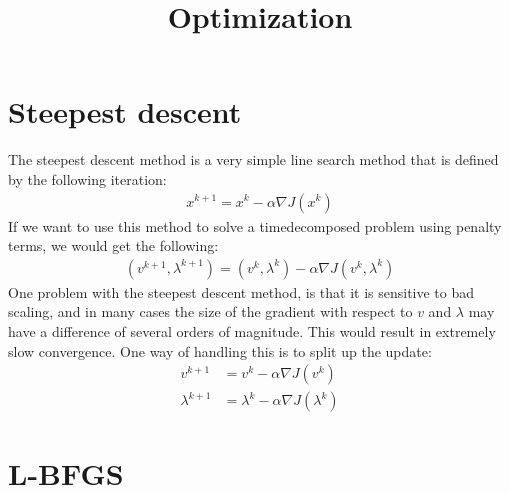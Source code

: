 \documentclass[11pt,a4paper]{article}
\title{Optimization}
\begin{document}
\section{Steepest descent}
The steepest descent method is a very simple line search method that is defined by the following iteration:
\begin{align*}
x^{k+1} = x^k - \alpha\nabla J(x^k)
\end{align*}
If we want to use this method to solve a timedecomposed problem using penalty terms, we would get the following:
\begin{align*}
(v^{k+1},\lambda^{k+1})= (v^k,\lambda^k)-\alpha\nabla J(v^k,\lambda^k)
\end{align*}
One problem with the steepest descent method, is that it is sensitive to bad scaling, and in many cases the size of the gradient with respect to $v$ and $\lambda$ may have a difference of several orders of magnitude. This would result in extremely slow convergence. One way of handling this is to split up the update:
\begin{align*}
v^{k+1} &= v^k - \alpha\nabla J(v^k)\\
\lambda^{k+1} &= \lambda^k - \alpha\nabla J(\lambda^k)
\end{align*}
\section{L-BFGS}
\end{document}
